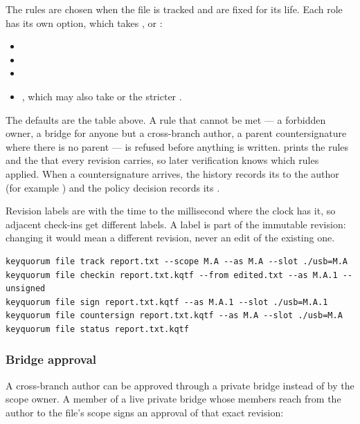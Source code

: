 The rules are chosen when the file is tracked and are fixed for its life.
Each role has its own option, which takes , 
or :

\begin{itemize}
  \item {}
  \item {}
  \item {}
  \item {}, which may also take
   or the stricter
  .
\end{itemize}

The defaults are the table above. A rule that cannot be met --- a forbidden
owner, a bridge for anyone but a cross-branch author, a parent
countersignature where there is no parent --- is refused before anything is
written.  prints the rules and the  that
every revision carries, so later verification knows which rules applied. When
a countersignature arrives, the history records its  to
the author (for example ) and the policy decision records
its .

Revision labels are  with the time to the
millisecond where the clock has it, so adjacent check-ins get different
labels. A label is part of the immutable revision: changing it would mean a
different revision, never an edit of the existing one.

\begin{lstlisting}
keyquorum file track report.txt --scope M.A --as M.A --slot ./usb=M.A
keyquorum file checkin report.txt.kqtf --from edited.txt --as M.A.1 --unsigned
keyquorum file sign report.txt.kqtf --as M.A.1 --slot ./usb=M.A.1
keyquorum file countersign report.txt.kqtf --as M.A --slot ./usb=M.A
keyquorum file status report.txt.kqtf
\end{lstlisting}

\subsubsection*{Bridge approval}

A cross-branch author can be approved through a private bridge instead of by
the scope owner. A member of a live private bridge whose members reach from
the author to the file's scope signs an approval of that exact revision:

